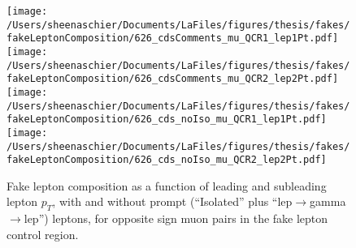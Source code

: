 \begin{figure}[htb]
        \centering
        \texttt{[image: /Users/sheenaschier/Documents/LaFiles/figures/thesis/fakes/fakeLeptonComposition/626\_cdsComments\_mu\_QCR1\_lep1Pt.pdf]}
        \texttt{[image: /Users/sheenaschier/Documents/LaFiles/figures/thesis/fakes/fakeLeptonComposition/626\_cdsComments\_mu\_QCR2\_lep2Pt.pdf]}
        \texttt{[image: /Users/sheenaschier/Documents/LaFiles/figures/thesis/fakes/fakeLeptonComposition/626\_cds\_noIso\_mu\_QCR1\_lep1Pt.pdf]}
        \texttt{[image: /Users/sheenaschier/Documents/LaFiles/figures/thesis/fakes/fakeLeptonComposition/626\_cds\_noIso\_mu\_QCR2\_lep2Pt.pdf]}
        \caption{Fake lepton composition as a function of leading and subleading lepton $p_{T}$, with and without prompt (``Isolated'' plus ``lep$\to$gamma$\to$lep'') leptons, for opposite sign muon pairs in the fake lepton control region.}
        \label{fig:muCR}
\end{figure}

